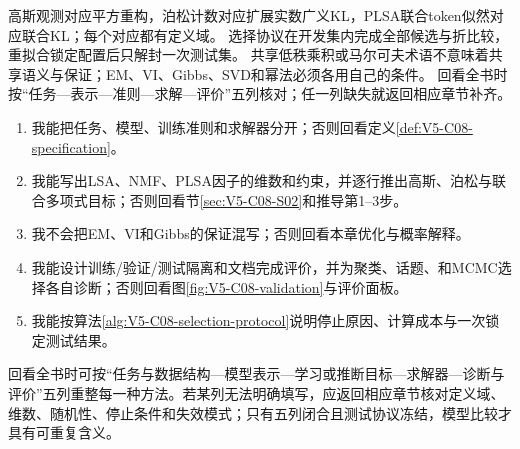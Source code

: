 \begin{SLCompactClosure}
\label{struct:V5-C08-CH36}
{高斯观测对应平方重构，泊松计数对应扩展实数广义KL，PLSA联合token似然对应联合KL；每个对应都有定义域。}
{选择协议在开发集内完成全部候选与折比较，重拟合锁定配置后只解封一次测试集。}
{共享低秩乘积或马尔可夫术语不意味着共享语义与保证；EM、VI、Gibbs、SVD和幂法必须各用自己的条件。}
{回看全书时按“任务—表示—准则—求解—评价”五列核对；任一列缺失就返回相应章节补齐。}

\label{struct:V5-C08-CH37}
\begin{selfcheckbox}
\begin{enumerate}[leftmargin=2.0em,topsep=0pt,itemsep=0pt,parsep=0pt,partopsep=0pt]
  \item 我能把任务、模型、训练准则和求解器分开；否则回看定义\ref{def:V5-C08-specification}。
  \item 我能写出LSA、NMF、PLSA因子的维数和约束，并逐行推出高斯、泊松与联合多项式目标；否则回看节\ref{sec:V5-C08-S02}和推导第1--3步。
  \item 我不会把EM、VI和Gibbs的保证混写；否则回看本章优化与概率解释。
  \item 我能设计训练/验证/测试隔离和文档完成评价，并为聚类、话题、\PageRank{}和MCMC选择各自诊断；否则回看图\ref{fig:V5-C08-validation}与评价面板。
  \item 我能按算法\ref{alg:V5-C08-selection-protocol}说明停止原因、计算成本与一次锁定测试结果。
\end{enumerate}
\end{selfcheckbox}
\begin{keypointbox}[title=全书回看建议]
回看全书时可按“任务与数据结构—模型表示—学习或推断目标—求解器—诊断与评价”五列重整每一种方法。若某列无法明确填写，应返回相应章节核对定义域、维数、随机性、停止条件和失效模式；只有五列闭合且测试协议冻结，模型比较才具有可重复含义。
\end{keypointbox}
\end{SLCompactClosure}
\endgroup

